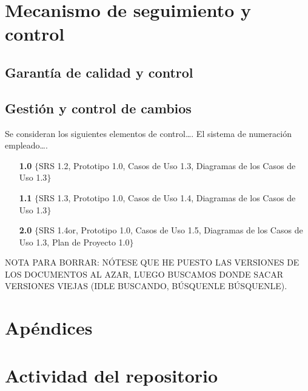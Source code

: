 \documentclass[11pt, a4paper, twoside]{report}
\begin{document}
	\section{Mecanismo de seguimiento y control}
		\subsection{Garantía de calidad y control}
		\subsection{Gestión y control de cambios}
			Se consideran los siguientes elementos de control\ldots. El sistema de numeración empleado\ldots.
		
		\begin{itemize}
			\item[\bfseries 1.0] $\{$SRS 1.2, Prototipo 1.0, Casos de Uso 1.3, Diagramas de los Casos de Uso 1.3$\}$
			\item[\bfseries 1.1] $\{$SRS 1.3, Prototipo 1.0, Casos de Uso 1.4, Diagramas de los Casos de Uso 1.3$\}$
			\item[\bfseries 2.0] $\{$SRS 1.4or, Prototipo 1.0, Casos de Uso 1.5, Diagramas de los Casos de Uso 1.3,
		Plan de Proyecto 1.0$\}$
		\end{itemize}

		\begin{center}NOTA PARA BORRAR: NÓTESE QUE HE PUESTO LAS VERSIONES DE LOS DOCUMENTOS AL AZAR,
		LUEGO BUSCAMOS DONDE SACAR VERSIONES VIEJAS (IDLE BUSCANDO, BÚSQUENLE BÚSQUENLE).\end{center}
		
	\newpage
	\section{Apéndices}
		\appendix
		\section{Actividad del repositorio}
			
		
		\newpage
		\normalsize
		\nocite{PSMAN}
		
		
\end{document}

